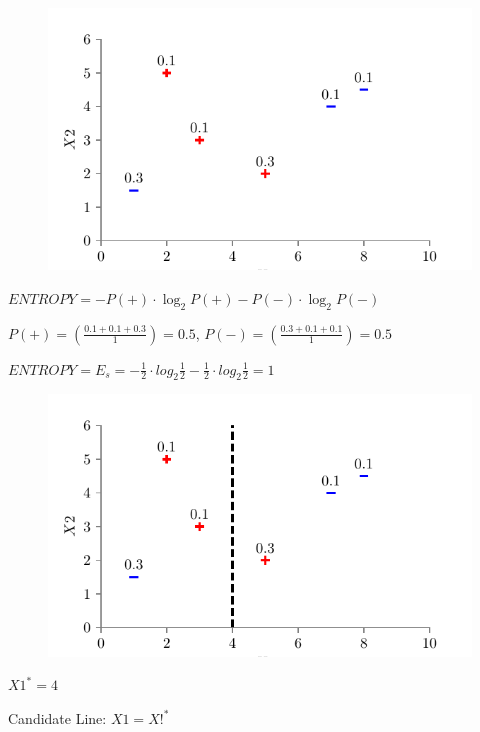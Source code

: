 \documentclass[usenames,dvipsnames]{beamer}
\begin{document}
\begin{frame}

\begin{figure}
	\centering
	\includegraphics{../figures/dt_weighted/fig2.pdf}
\end{figure}

\(ENTROPY = - P(+) \cdot \log_2 P(+) - P(-) \cdot \log_2 P(-)\)

\(P(+) = \left( \frac{0.1 + 0.1 + 0.3}{1} \right) = 0.5\),      \(P(-) = \left( \frac{0.3 + 0.1 + 0.1}{1} \right) = 0.5\)

\(ENTROPY  = E_s =  - \frac{1}{2} \cdot log_2 \frac{1}{2}  - \frac{1}{2} \cdot log_2 \frac{1}{2}  = 1\)

\end{frame}





\begin{frame}

\begin{figure}
	\centering
	\includegraphics{../figures/dt_weighted/fig3.pdf}
\end{figure}

\(X1^* = 4\)


Candidate Line: \(X1 = X!^*\)


\end{frame}
\end{document}
